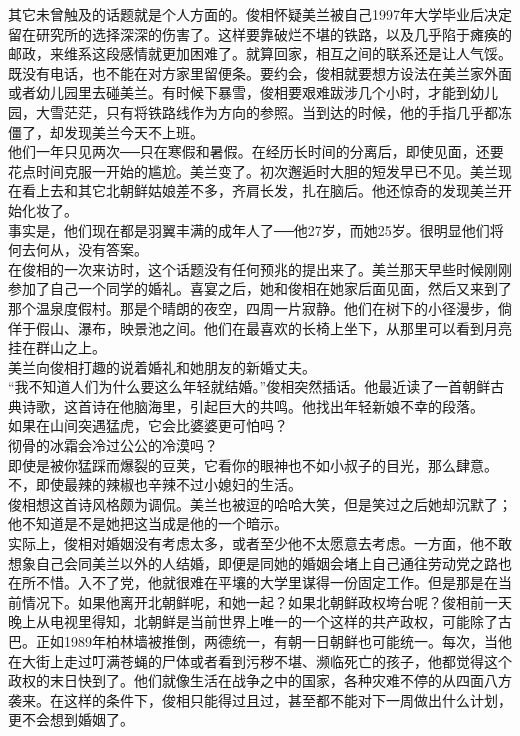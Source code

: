 其它未曾触及的话题就是个人方面的。俊相怀疑美兰被自己1997年大学毕业后决定留在研究所的选择深深的伤害了。这样要靠破烂不堪的铁路，以及几乎陷于瘫痪的邮政，来维系这段感情就更加困难了。就算回家，相互之间的联系还是让人气馁。既没有电话，也不能在对方家里留便条。要约会，俊相就要想方设法在美兰家外面或者幼儿园里去碰美兰。有时候下暴雪，俊相要艰难跋涉几个小时，才能到幼儿园，大雪茫茫，只有将铁路线作为方向的参照。当到达的时候，他的手指几乎都冻僵了，却发现美兰今天不上班。\\

他们一年只见两次──只在寒假和暑假。在经历长时间的分离后，即使见面，还要花点时间克服一开始的尴尬。美兰变了。初次邂逅时大胆的短发早已不见。美兰现在看上去和其它北朝鲜姑娘差不多，齐肩长发，扎在脑后。他还惊奇的发现美兰开始化妆了。\\

事实是，他们现在都是羽翼丰满的成年人了──他27岁，而她25岁。很明显他们将何去何从，没有答案。\\

在俊相的一次来访时，这个话题没有任何预兆的提出来了。美兰那天早些时候刚刚参加了自己一个同学的婚礼。喜宴之后，她和俊相在她家后面见面，然后又来到了那个温泉度假村。那是个晴朗的夜空，四周一片寂静。他们在树下的小径漫步，倘佯于假山、瀑布，映景池之间。他们在最喜欢的长椅上坐下，从那里可以看到月亮挂在群山之上。\\

美兰向俊相打趣的说着婚礼和她朋友的新婚丈夫。\\

“我不知道人们为什么要这么年轻就结婚。”俊相突然插话。他最近读了一首朝鲜古典诗歌，这首诗在他脑海里，引起巨大的共鸣。他找出年轻新娘不幸的段落。\\

如果在山间突遇猛虎，它会比婆婆更可怕吗？\\

彻骨的冰霜会冷过公公的冷漠吗？\\

即使是被你猛踩而爆裂的豆荚，它看你的眼神也不如小叔子的目光，那么肆意。\\

不，即使最辣的辣椒也辛辣不过小媳妇的生活。\\

俊相想这首诗风格颇为调侃。美兰也被逗的哈哈大笑，但是笑过之后她却沉默了；他不知道是不是她把这当成是他的一个暗示。\\

实际上，俊相对婚姻没有考虑太多，或者至少他不太愿意去考虑。一方面，他不敢想象自己会同美兰以外的人结婚，即便是同她的婚姻会堵上自己通往劳动党之路也在所不惜。入不了党，他就很难在平壤的大学里谋得一份固定工作。但是那是在当前情况下。如果他离开北朝鲜呢，和她一起？如果北朝鲜政权垮台呢？俊相前一天晚上从电视里得知，北朝鲜是当前世界上唯一的一个这样的共产政权，可能除了古巴。正如1989年柏林墙被推倒，两德统一，有朝一日朝鲜也可能统一。每次，当他在大街上走过叮满苍蝇的尸体或者看到污秽不堪、濒临死亡的孩子，他都觉得这个政权的末日快到了。他们就像生活在战争之中的国家，各种灾难不停的从四面八方袭来。在这样的条件下，俊相只能得过且过，甚至都不能对下一周做出什么计划，更不会想到婚姻了。\\


